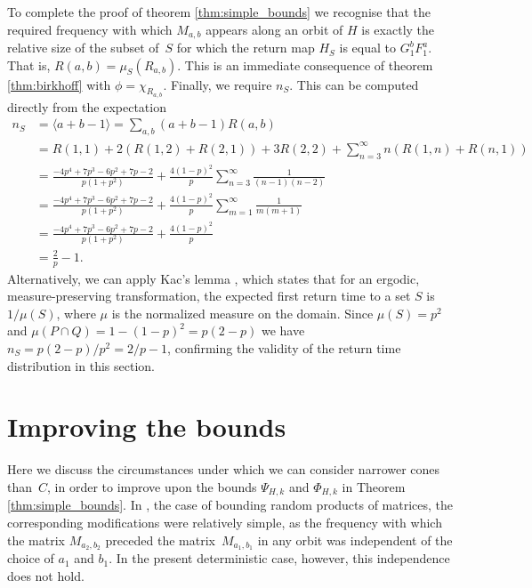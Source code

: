 \documentclass{iopart}
\begin{document}
To complete the proof of theorem \ref{thm:simple_bounds} we recognise that the required frequency with which $M_{a,b}$ appears along an orbit of $H$ is exactly the relative size of the subset of~$S$ for which the return 
map $H_S$ is equal to $G_1^b F_1^a$. That is, $R(a,b) = \mu_S(R_{a,b})$. This is an immediate consequence of theorem \ref{thm:birkhoff} with $\phi =  \chi_{R_{a,b}}$. Finally, we require $n_S$. This 
can be computed directly from the expectation 
\begin{align*}
n_S &= \langle a+b-1 \rangle =\sum_{a,b} (a+b-1) R(a,b) \\
& = R(1,1) + 2(R(1,2)+R(2,1)) +3R(2,2) + \sum_{n = 3}^\infty n (R(1,n) + R(n,1))\\
& = \frac{-4p^4+7p^3-6p^2+7p-2}{p(1+p^2)} + \frac{4(1-p)^2}{p} \sum_{n = 3}^\infty \frac{1}{(n-1)(n-2)}\\
& = \frac{-4p^4+7p^3-6p^2+7p-2}{p(1+p^2)} + \frac{4(1-p)^2}{p} \sum_{m = 1}^\infty \frac{1}{m(m+1)}\\
& = \frac{-4p^4+7p^3-6p^2+7p-2}{p(1+p^2)} + \frac{4(1-p)^2}{p}\\
& = \frac{2}{p} - 1.
\end{align*}
Alternatively, we can apply Kac's lemma \cite{kac1947notion},  which states that for an ergodic, measure-preserving transformation, the expected first return time to a set $S$ is $1/ \mu(S)$, where $\mu$ is the normalized measure on the domain. Since $\mu(S) = p^2$ and $\mu(P \cap Q) = 1-(1-p)^2 = p(2-p)$ we have $n_S = p(2-p)/p^2 = 2/p-1$, confirming the validity of the return time distribution in this section.





\section{Improving the bounds}\label{sec:improve}

Here we discuss the circumstances under which we can consider narrower cones than~$C$, in order to improve upon the bounds 
$\Psi_{H,k}$ and $\Phi_{H,k}$ in Theorem \ref{thm:simple_bounds}. In \cite{sturman2019lyapunov}, the case of bounding random products of matrices, the corresponding modifications were relatively simple, as the frequency with which the matrix $M_{a_2,b_2}$ preceded the matrix~$M_{a_1,b_1}$ in any orbit was independent of the choice of $a_1$ and $b_1$. In the present deterministic case, however, this independence does not hold. 
\end{document}
